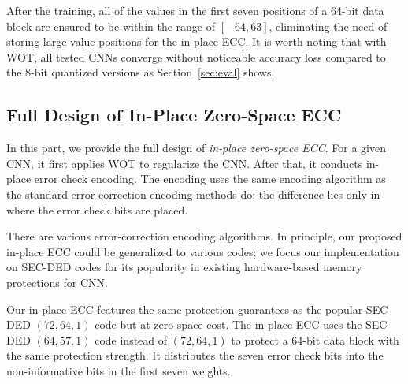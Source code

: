 \documentclass{article}
\newcommand{\TODO}[1]{{\it \color{blue}\{TODO: #1\}}}
\begin{document}
After the training, all of the values in the first seven positions of a 64-bit data block are ensured to be within the range of $[-64, 63]$, eliminating the need of storing large value positions for the in-place ECC. It is worth noting that with WOT, all tested CNNs converge without noticeable accuracy loss compared to the 8-bit quantized versions as Section~\ref{sec:eval} shows.    




\subsection{Full Design of In-Place Zero-Space ECC}

In this part, we provide the full design of {\em in-place zero-space ECC}. For a given CNN, it first applies WOT to regularize the CNN. After that, it conducts in-place error check encoding. The encoding uses the same encoding algorithm as the standard error-correction encoding methods do; the difference lies only in where the error check bits are placed. 

There are various error-correction encoding algorithms. 
In principle, our proposed in-place ECC could be generalized to various codes; we focus our implementation on SEC-DED codes for its popularity in existing hardware-based memory protections for CNN.  

Our in-place ECC features the same protection guarantees as the popular SEC-DED $(72, 64, 1)$ code but at zero-space cost.
The in-place ECC uses the SEC-DED $(64, 57, 1)$ code instead of $(72, 64, 1)$ to protect a 64-bit data block with the same protection strength. It distributes the seven error check bits into the non-informative bits in the first seven weights. 
\end{document}
